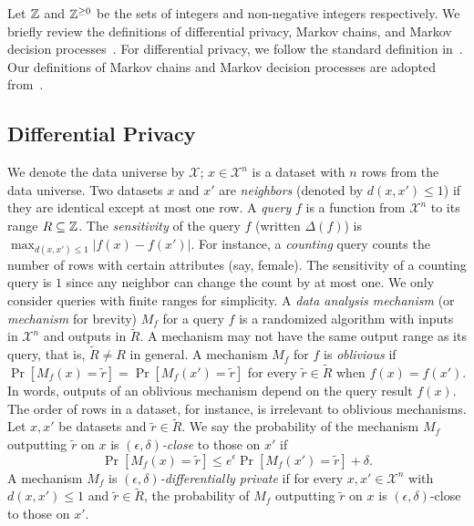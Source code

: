 
Let $\mathbb{Z}$ and $\mathbb{Z}^{\geq 0}$ be the sets of integers and non-negative integers respectively.
We briefly review the definitions of differential privacy, Markov
chains, and Markov decision processes~\cite{Put05}. For differential privacy, we
follow the standard definition in~\cite{DR:14:AFDP,GRS:09:UUPM,GRS:12:UUPM}. Our
definitions of Markov chains and Markov decision processes are adopted
from~\cite{BK:08:PMC}.

\subsection{Differential Privacy}
We denote the data universe by $\mathcal{X}$; $x \in \mathcal{X}^n$ is
a dataset with $n$ rows from the data universe. Two datasets $x$ and
$x'$ are \emph{neighbors} (denoted by $d(x, x') \leq 1$) if they are
identical except at most one row. A \emph{query} $f$ is a function
from $\mathcal{X}^n$ to its range $R \subseteq \mathbb{Z}$. The \emph{sensitivity} of the
query $f$ (written $\Delta (f)$) is $\max_{d(x, x') \leq 1} | f (x) -
f (x') |$. For instance, a \emph{counting} query counts the number
of rows with certain attributes (say, female). The sensitivity of a
counting query is $1$ since any neighbor can change the count by at
most one. We only consider queries with finite  ranges for simplicity.
A \emph{data analysis mechanism} (or
\emph{mechanism} for brevity) $M_f$ for a query $f$
is a randomized algorithm with inputs in $\mathcal{X}^n$ and outputs
in $\tilde{R}$.
A mechanism may not have the same output range as its query, that is,
$\tilde{R} \neq R$ in general.
A mechanism $M_f$ for $f$ is \emph{oblivious} if
$\Pr[M_f(x) = \tilde{r}] = \Pr[M_f(x') = \tilde{r}]$ for every
$\tilde{r} \in \tilde{R}$ when $f (x) = f (x')$. In words, outputs of an
oblivious mechanism depend on the query result $f (x)$.
The order of rows in a dataset, for instance, is
irrelevant to oblivious mechanisms. Let $x, x'$
be datasets and $\tilde{r} \in \tilde{R}$. We say the probability of
the mechanism $M_f$ outputting $\tilde{r}$ on $x$ is
\emph{$(\epsilon, \delta)$-close} to those on $x'$ if
\[
\Pr[M_f (x) = \tilde{r}] \leq e^{\epsilon} \Pr[M_f (x') =
\tilde{r}] + \delta.
\]
A mechanism $M_f$ is \emph{$(\epsilon, \delta)$-differentially
  private} %
if for every $x, x' \in \mathcal{X}^n$ with $d(x, x') \leq 1$
and $\tilde{r} \in \tilde{R}$, the probability of
$M_f$ outputting $\tilde{r}$ on $x$ is $(\epsilon, \delta)$-close to
those on $x'$.

